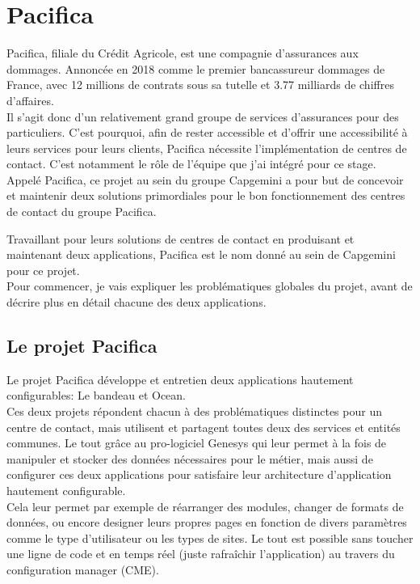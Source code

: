 \documentclass{rapport}
\begin{document}
\newpage

\section{Pacifica}

Pacifica, filiale du Crédit Agricole, est une compagnie d'assurances aux dommages. Annoncée en 2018 comme le premier bancassureur dommages de France, avec 12 millions de contrats sous sa tutelle et 3.77 milliards de chiffres d'affaires.\\

Il s'agit donc d'un relativement grand groupe de services d'assurances pour des particuliers. C'est pourquoi, afin de rester accessible et d'offrir une accessibilité à leurs services pour leurs clients, Pacifica nécessite l'implémentation de centres de contact. C'est notamment le rôle de l'équipe que j'ai intégré pour ce stage. Appelé Pacifica, ce projet au sein du groupe Capgemini a pour but de concevoir et maintenir deux solutions primordiales pour le bon fonctionnement des centres de contact du groupe Pacifica.

Travaillant pour leurs solutions de centres de contact en produisant et maintenant deux applications, Pacifica est le nom donné au sein de Capgemini pour ce projet.\\

Pour commencer, je vais expliquer les problématiques globales du projet, avant de décrire plus en détail chacune des deux applications.


\subsection{Le projet Pacifica}

Le projet Pacifica développe et entretien deux applications hautement configurables: Le bandeau et Ocean.\\
Ces deux projets répondent chacun à des problématiques distinctes pour un centre de contact, mais utilisent et partagent toutes deux des services et entités communes. Le tout grâce au pro-logiciel Genesys qui leur permet à la fois de manipuler et stocker des données nécessaires pour le métier, mais aussi de configurer ces deux applications pour satisfaire leur architecture d'application hautement configurable.\\
Cela leur permet par exemple de réarranger des modules, changer de formats de données, ou encore designer leurs propres pages en fonction de divers paramètres comme le type d'utilisateur ou les types de sites. Le tout est possible sans toucher une ligne de code et en temps réel (juste rafraîchir l'application) au travers du configuration manager (CME).
\end{document}
